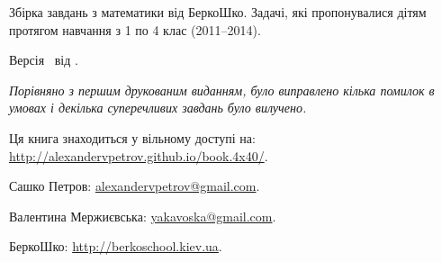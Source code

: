 
{
\small

\noindent
Збірка завдань з математики від БеркоШко.
Задачі, які пропонувалися дітям протягом навчання з 1 по 4 клас (2011--2014).

\bigskip

\noindent
Версія \Version\ від \Date.

\bigskip

\noindent
\emph{Порівняно з першим друкованим виданням, було виправлено кілька помилок
в умовах і декілька суперечливих завдань було вилучено.}

\bigskip

\noindent
Ця книга знаходиться у вільному доступі на:\\
\url{http://alexandervpetrov.github.io/book.4x40/}.

\bigskip

\noindent
Сашко Петров: \href{mailto:alexandervpetrov@gmail.com}{alexandervpetrov@gmail.com}.

\noindent
Валентина Мержиєвська: \href{mailto:yakavoska@gmail.com}{yakavoska@gmail.com}.

\bigskip

\noindent
БеркоШко: \url{http://berkoschool.kiev.ua}.
}

\clearpage
